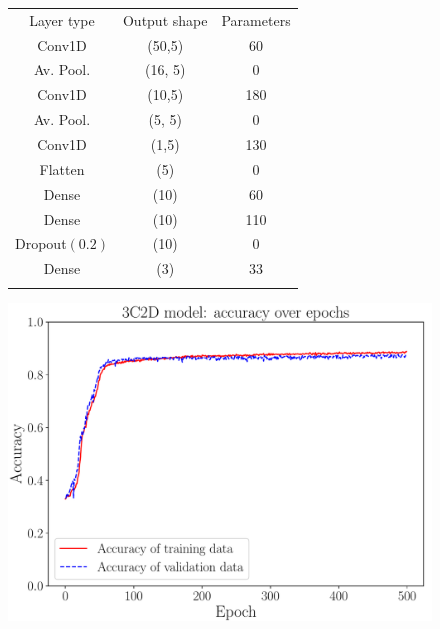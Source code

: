 \documentclass[prl,twocolumn]{revtex4-1}
\begin{document}
\begin{figure}[!tb]
    \begin{minipage}{0.66\columnwidth}
        {\footnotesize
        \begin{tabular}{ccc}
            \toprule
            Layer type & Output shape & Parameters \\
            \colrule
            Conv1D & (50,5) & 60 \\
            Av. Pool. & (16, 5) &0 \\
            Conv1D & (10,5) & 180 \\
            Av. Pool. & (5, 5) & 0 \\
            Conv1D & (1,5) & 130 \\
            Flatten & (5) &0 \\
            Dense & (10) & 60 \\
            Dense & (10) & 110 \\
            Dropout$(0.2)$ & (10) & 0 \\
            Dense & (3) & 33 \\
            \botrule
        \end{tabular}}
    \end{minipage}
    \hfill
    \begin{minipage}{0.66\columnwidth}
        \includegraphics[width=\textwidth]{Images/Results/3C2D_accs.pdf}
    \end{minipage}
    \hfill
    \begin{minipage}{0.66\columnwidth}

\end{minipage}
\end{figure}
\end{document}
